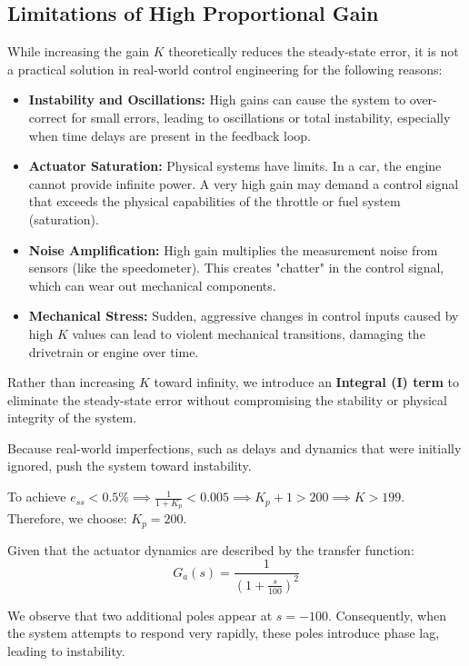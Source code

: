 \documentclass[conference]{IEEEtran}
\begin{document}
\subsection{Limitations of High Proportional Gain}
While increasing the gain $K$ theoretically reduces the steady-state error, it is not a practical solution in real-world control engineering for the following reasons:

\begin{itemize}
    \item \textbf{Instability and Oscillations:} High gains can cause the system to over-correct for small errors, leading to oscillations or total instability, especially when time delays are present in the feedback loop.
    \item \textbf{Actuator Saturation:} Physical systems have limits. In a car, the engine cannot provide infinite power. A very high gain may demand a control signal that exceeds the physical capabilities of the throttle or fuel system (saturation).
    \item \textbf{Noise Amplification:} High gain multiplies the measurement noise from sensors (like the speedometer). This creates "chatter" in the control signal, which can wear out mechanical components.
    \item \textbf{Mechanical Stress:} Sudden, aggressive changes in control inputs caused by high $K$ values can lead to violent mechanical transitions, damaging the drivetrain or engine over time.
\end{itemize}

Rather than increasing $K$ toward infinity, we introduce an \textbf{Integral (I) term} to eliminate the steady-state error without compromising the stability or physical integrity of the system.

Because real-world imperfections, such as delays and dynamics that were initially ignored, push the system toward instability.

To achieve $e_{ss} < 0.5\% \implies \frac{1}{1+K_p} < 0.005 \implies K_p + 1 > 200 \implies K > 199$.
Therefore, we choose: $K_p = 200$.

Given that the actuator dynamics are described by the transfer function:
\begin{equation}
    G_a(s) = \frac{1}{\left(1 + \frac{s}{100}\right)^2}
\end{equation}

We observe that two additional poles appear at $s = -100$. Consequently, when the system attempts to respond very rapidly, these poles introduce phase lag, leading to instability.
\end{document}
